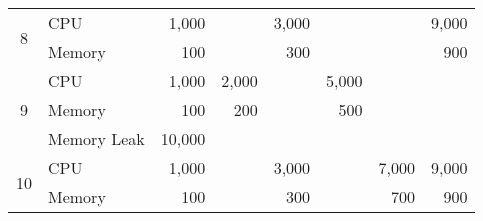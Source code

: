 \begin{center}
\begin{tabular}{| c | l | r | r | r | r | r | r |}
\multirow{2}{*}{8} & CPU & 1,000 & & 3,000 & & & 9,000 \\
  & Memory & 100 & & 300 & & & 900 \\ \hline
\multirow{3}{*}{9} & CPU & 1,000 & 2,000 & & 5,000 & &  \\
  & Memory & 100 & 200 & & 500 & & \\ 
  & Memory Leak & 10,000 & & & & & \\ \hline
 \multirow{2}{*}{10} & CPU & 1,000 & & 3,000 & & 7,000 & 9,000 \\
  & Memory & 100 & & 300 & & 700 & 900 \\ \hline
\end{tabular}
\end{center}





